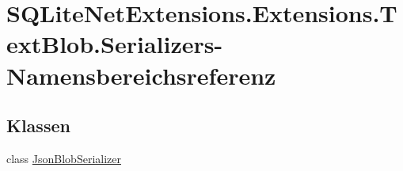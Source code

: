 \hypertarget{namespace_s_q_lite_net_extensions_1_1_extensions_1_1_text_blob_1_1_serializers}{}\section{S\+Q\+Lite\+Net\+Extensions.\+Extensions.\+Text\+Blob.\+Serializers-\/\+Namensbereichsreferenz}
\label{namespace_s_q_lite_net_extensions_1_1_extensions_1_1_text_blob_1_1_serializers}
\subsection*{Klassen}
\begin{DoxyCompactItemize}
\item 
class \mbox{\hyperlink{class_s_q_lite_net_extensions_1_1_extensions_1_1_text_blob_1_1_serializers_1_1_json_blob_serializer}{Json\+Blob\+Serializer}}
\end{DoxyCompactItemize}
